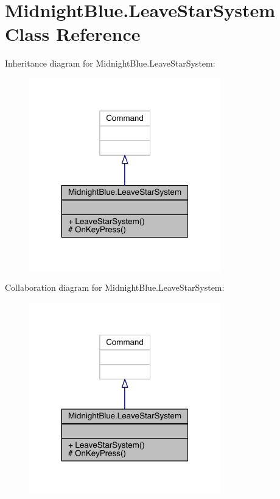 \hypertarget{class_midnight_blue_1_1_leave_star_system}{}\section{Midnight\+Blue.\+Leave\+Star\+System Class Reference}
\label{class_midnight_blue_1_1_leave_star_system}


Inheritance diagram for Midnight\+Blue.\+Leave\+Star\+System\+:
\nopagebreak
\begin{figure}[H]
\begin{center}
\leavevmode
\includegraphics[width=236pt]{class_midnight_blue_1_1_leave_star_system__inherit__graph}
\end{center}
\end{figure}


Collaboration diagram for Midnight\+Blue.\+Leave\+Star\+System\+:
\nopagebreak
\begin{figure}[H]
\begin{center}
\leavevmode
\includegraphics[width=236pt]{class_midnight_blue_1_1_leave_star_system__coll__graph}
\end{center}
\end{figure}
